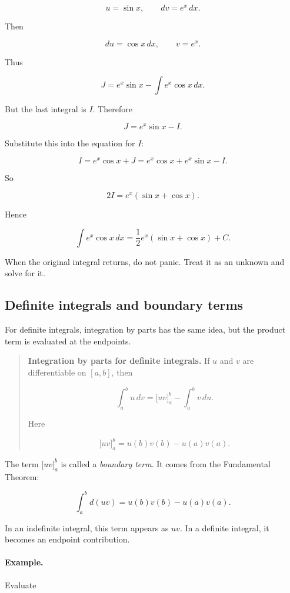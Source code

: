 \[
u=\sin x,
\qquad
dv=e^x\,dx.
\]

Then

\[
du=\cos x\,dx,
\qquad
v=e^x.
\]

Thus

\[
J=e^x\sin x-\int e^x\cos x\,dx.
\]

But the last integral is \(I\).  Therefore

\[
J=e^x\sin x-I.
\]

Substitute this into the equation for \(I\):

\[
I=e^x\cos x+J
=
e^x\cos x+e^x\sin x-I.
\]

So

\[
2I=e^x(\sin x+\cos x).
\]

Hence

\[
\boxed{
\int e^x\cos x\,dx
=
\frac12 e^x(\sin x+\cos x)+C.
}
\]

When the original integral returns, do not panic.  Treat it as an unknown and solve for
it.

\subsection{Definite integrals and boundary terms}
\label{subsec:definite-integrals-boundary-terms}

For definite integrals, integration by parts has the same idea, but the product term is
evaluated at the endpoints.

\begin{quote}
\textbf{Integration by parts for definite integrals.}
If \(u\) and \(v\) are differentiable on \([a,b]\), then

\[
\boxed{
\int_a^b u\,dv
=
\bigl[uv\bigr]_a^b-\int_a^b v\,du.
}
\]

Here

\[
\bigl[uv\bigr]_a^b=u(b)v(b)-u(a)v(a).
\]
\end{quote}

The term \(\bigl[uv\bigr]_a^b\) is called a \emph{boundary term}.  It comes from the
Fundamental Theorem:

\[
\int_a^b d(uv)=u(b)v(b)-u(a)v(a).
\]

In an indefinite integral, this term appears as \(uv\).  In a definite integral, it becomes
an endpoint contribution.

\paragraph{Example.}
Evaluate

